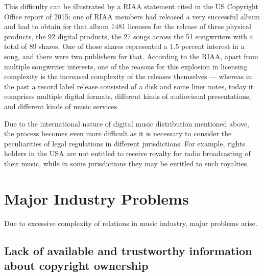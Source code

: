 \documentclass[12pt]{report}
\begin{document}
This difficulty can be illustrated by a RIAA statement cited in the US Copyright Office report of 2015: one of RIAA members had released a very successful album and had to obtain for that album 1481 licenses for the release of three physical products, the 92 digital products, the 27 songs across the 51 songwriters with a total of 89 shares. One of those shares represented a 1.5 percent interest in a song, and there were two publishers for that. According to the RIAA, apart from multiple songwriter interests, one of the reasons for this explosion in licensing complexity is the increased complexity of the releases themselves — whereas in the past a record label release consisted of a disk and some liner notes, today it comprises multiple digital formats, different kinds of audiovisual presentations, and different kinds of music services.

Due to the international nature of digital music distribution mentioned above, the process becomes even more difficult as it is necessary to consider the peculiarities of legal regulations in different jurisdictions. For example, rights holders in the USA are not entitled to receive royalty for radio broadcasting of their music, while in some jurisdictions they may be entitled to such royalties.

\vfill\null\pagebreak

\section{Major Industry Problems}
\label{industry-problems}
Due to excessive complexity of relations in music industry, major problems arise.

\subsection{Lack of available and trustworthy information about copyright ownership}
\end{document}

